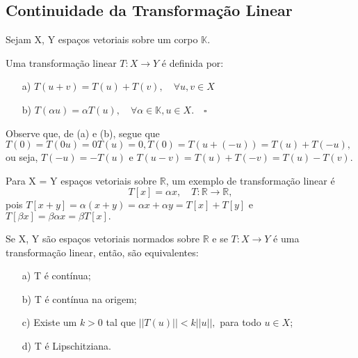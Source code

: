 \documentclass[metric_notes.tex]{subfiles}
\begin{document}
\subsection{Continuidade da Transformação Linear}
Sejam X, Y espaços vetoriais sobre um corpo \(\mathbb{K}\).
\begin{def*}
	Uma transformação linear \(T:X\rightarrow Y\) é definida por:
	\begin{itemize}
		\item[a)] \(T(u+v)=T(u)+T(v),\quad \forall u, v\in X\)
		\item[b)] \(T(\alpha u) = \alpha T(u),\quad \forall \alpha \in \mathbb{K}, u\in X.\quad\square\)
	\end{itemize}
\end{def*}
Observe que, de (a) e (b), segue que \(T(0) = T(0u) = 0T(u) = 0, T(0) = T(u+(-u)) = T(u) + T(-u),\) ou seja,
\(T(-u) = -T(u)\) e \(T(u-v) = T(u) + T(-v) = T(u) - T(v)\).
\begin{example}
	Para X = Y espaços vetoriais sobre \(\mathbb{R}\), um exemplo de transformação linear é
	\[
		T[x] = \alpha x,\quad T:\mathbb{R}\rightarrow \mathbb{R},
	\]
	pois \(T[x+y] = \alpha (x+y) = \alpha x + \alpha y = T[x] + T[y]\) e \(T[\beta x] = \beta \alpha x = \beta T[x].\)
\end{example}
\begin{theorem*}
	Se X, Y são espaços vetoriais normados sobre \(\mathbb{R}\) e se \(T:X\rightarrow Y\) é uma transformação linear, então, são equivalentes:
	\begin{itemize}
		\item[a)] T é contínua;
		\item[b)] T é contínua na origem;
		\item[c)] Existe um \(k > 0\) tal que \(||T(u)|| < k||u||,\) para todo \(u\in X\);
		\item[d)] T é Lipschitziana.
	\end{itemize}
\end{theorem*}
\end{document}
